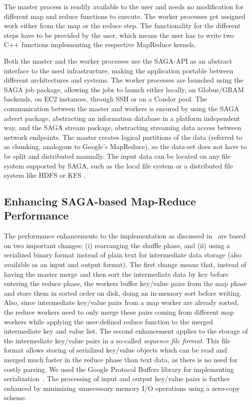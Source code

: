 \documentclass[graybox]{svmult}
\begin{document}
The master process is readily available to the user and needs no
modification for different map and reduce functions to execute.  The
worker processes get assigned work either from the map or the reduce
step. The functionality for the different steps have to be provided by
the user, which means the user has to write two C++ functions
implementing the respective MapReduce kernels.

Both the master and the worker processes use the SAGA-API as an
abstract interface to the used infrastructure, making the application
portable between different architectures and systems.  The worker
processes are launched using the SAGA job package, allowing the jobs
to launch either locally, on Globus/GRAM backends, on EC2 instances, through SSH
or on a Condor pool. The communication between the master and workers
is ensured by using the SAGA advert package, abstracting an
information database in a platform independent way, and the SAGA stream
package, abstracting streaming data access between network endpoints.
The master creates logical partitions of the data (referred to as chunking,
analogous to Google's MapReduce), so the data-set does not have to be split
and distributed manually.  The input data can be located on any file system
supported by SAGA, such as the local file system or a distributed file system
like HDFS or KFS \cite{KFS}.


\subsection{Enhancing SAGA-based Map-Reduce Performance}

The performance enhancements to the \sagamapreduce implementation as
discussed in~\cite{saga_ccgrid09} are based on two important changes:
(i) rearranging the shuffle phase, and (ii) using a serialized binary
format instead of plain text for intermediate data storage (also
available as an input and output format).  The first change means
that, instead of having the master merge and then sort the
intermediate data by key before entering the reduce phase, the workers
buffer key/value pairs from the map phase and store them in sorted
order on disk, doing an in-memory sort before writing. Also, since
intermediate key/value pairs from a map worker are already sorted, the
reduce workers need to only merge these pairs coming from different
map workers while applying the user-defined reduce function to the
merged intermediate key and value list.  The second enhancement
applies to the storage of the intermediate key/value pairs in a
so-called \emph{sequence file format}. This file format allows storing
of serialized key/value objects which can be read and merged much
faster in the reduce phase than text data, as there is no need for
costly parsing.  We used the Google Protocol Buffers library for
implementing serialization~\cite{protobuf}.  The processing of input
and output key/value pairs is further enhanced by minimizing
unnecessary memory I/O operations using a zero-copy scheme.
\end{document}
